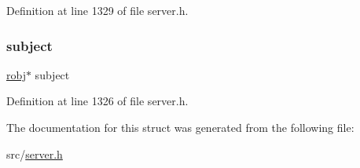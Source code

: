 Definition at line 1329 of file server.\+h.

\mbox{\label{structlist_type_iterator_a8bd087874443f3e41cf5f728d8490693}} 
\subsubsection{\texorpdfstring{subject}{subject}}
{\footnotesize\ttfamily \hyperlink{server_8h_a540f174d2685422fbd7d12e3cd44c8e2}{robj}$\ast$ subject}



Definition at line 1326 of file server.\+h.



The documentation for this struct was generated from the following file\+:\begin{DoxyCompactItemize}
\item 
src/\hyperlink{server_8h}{server.\+h}\end{DoxyCompactItemize}

